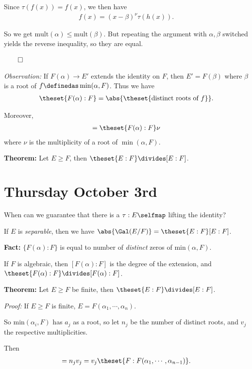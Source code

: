 Since \(\tau(f(x)) = f(x)\), we then have
\begin{align*}
f(x) = (x-\beta)^\nu \tau(h(x))
.\end{align*}

So we get \(\mathrm{mult}(\alpha) \leq \mathrm{mult}(\beta)\). But
repeating the argument with \(\alpha, \beta\) switched yields the
reverse inequality, so they are equal.

\(\qed\)

\emph{Observation:} If \(F(\alpha) \to E'\) extends the identity on
\(F\), then \(E' = F(\beta)\) where \(\beta\) is a root of
\(f \definedas \min(\alpha, F)\). Thus we have
\begin{align*}
\theset{F(\alpha): F} = \abs{\theset{\text{distinct roots of } f}}
.\end{align*}

Moreover,
\begin{align*}
[F(\alpha): F] = \theset{F(\alpha) : F} \nu
\end{align*} where \(\nu\) is the multiplicity of a root of
\(\min(\alpha, F)\).

\textbf{Theorem:} Let \(E \geq F\), then
\(\theset{E: F} \divides [E: F]\).

\hypertarget{thursday-october-3rd}{%
\section{Thursday October 3rd}\label{thursday-october-3rd}}

When can we guarantee that there is a \(\tau: E\selfmap\) lifting the
identity?

If \(E\) is \emph{separable}, then we have
\(\abs{ \Gal (E/F) } = \theset{E: F} [E: F]\).

\textbf{Fact:} \(\{F(\alpha): F \}\) is equal to number of
\emph{distinct} zeros of \(\mathrm{min}(\alpha, F)\).

If \(F\) is algebraic, then \([F(\alpha): F]\) is the degree of the
extension, and \(\theset{F(\alpha): F} \divides [F(\alpha): F]\).

\textbf{Theorem:} Let \(E \geq F\) be finite, then
\(\theset{E: F} \divides [E:F]\).

\emph{Proof:} If \(E \geq F\) is finite,
\(E = F(\alpha_1, \cdots, \alpha_n)\).

So \(\mathrm{min}(\alpha_i, F)\) has \(a_j\) as a root, so let \(n_j\)
be the number of distinct roots, and \(v_j\) the respective
multiplicities.

Then
\begin{align*}
[F: F(\alpha_1, \cdots, \alpha_{n-1})] = n_j v_j = v_j \theset{F: F(\alpha_1, \cdots, \alpha_{n-1})}
.\end{align*}


